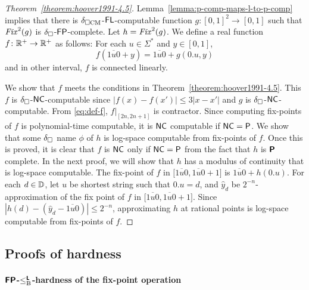 \documentclass[envcountsame,orivec,oribibl]{llncs}
\begin{document}
\begin{proof}
[Theorem~\ref{theorem:hoover1991-4.5}]
 Lemma~\ref{lemma:p-comp-maps-l-to-p-comp} implies that
 there is $\delta _{\square \mathrm{CM}}$-$\mathsf{FL}$-computable function 
 $g \colon [0,1]^2 \to [0,1]$ such that $\mathit{Fix}^2(g)$ is
 $\delta _\square$-$\mathsf{FP}$-complete. Let $h = \mathit{Fix}^2(g)$.
 We define a real function $f \colon \mathbb R^+ \to \mathbb R^+$ as follows:
 For each $u \in \Sigma^*$ and $y \in [0, 1]$,
 \begin{equation}
  \label{eq:def-f}
 f(\overline{1u0} + y) = \overline{1u0} + g(0.u, y)
 \end{equation}
 and in other interval, $f$ is connected linearly.

 We show that $f$ meets the conditions in Theorem~\ref{theorem:hoover1991-4.5}.
 This $f$ is $\delta _\square$-$\mathsf{NC}$-computable since 
 $|f(x) - f(x')| \le 3|x-x'|$ and $g$ is $\delta _\square$-$\mathsf{NC}$-computable.
 From \eqref{eq:def-f},  $f|_{[2n, 2n+1]}$ is contractor.
 Since computing fix-points of $f$ is polynomial-time computable, 
 it is $\mathsf{NC}$ computable if $\mathsf{NC} = \mathsf{P}$.
 We show that some $\delta _\square$ name $\phi$ of $h$ is log-space computable 
 from fix-points of $f$.
 Once this is proved, it is clear that $f$ is $\mathsf{NC}$ only if 
 $\mathsf{NC} = \mathsf{P}$ from the fact that $h$ is $\text{\bfseries \sffamily \upshape P}$ complete.
 In the next proof, we will show that $h$ has a modulus of continuity that is
 log-space computable. 
 The fix-point of $f$ in $\bigl[ \overline{1u0}, \overline{1u0}+1 \bigr]$ is
 $\overline{1u0} + h(0.u)$.
 For each $d \in \mathbb D$, let $u$ be shortest string such that $0.u = d$,
 and $\hat y_d$ be $2^{-n}$-approximation of the fix point of $f$ in
 $\bigl[ \overline{1u0}, \overline{1u0}+1 \bigr]$.
 Since  $\left|h(d) - \left( \hat y_d - \overline{1u0} \right)\right| \le 2^{-n}$,
 approximating $h$ at rational points is log-space computable from fix-points of $f$.
\end{proof}

\subsection{Proofs of hardness}

\paragraph{$\text{\bfseries \sffamily \upshape FP}$-$\leq _{\mathrm B} ^{\text{\bfseries \sffamily \upshape L}}$-hardness of the fix-point operation}
\end{document}
